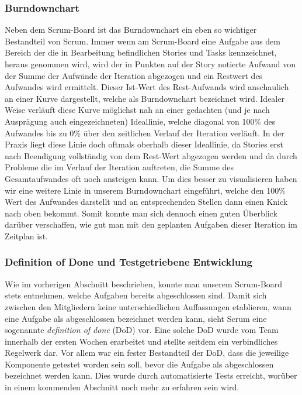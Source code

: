 \subsubsection{Burndownchart}
Neben dem Scrum-Board ist das Burndownchart ein eben so wichtiger Bestandteil von Scrum. Immer wenn am Scrum-Board eine Aufgabe aus dem Bereich der die in Bearbeitung befindlichen Stories und Tasks kennzeichnet, heraus genommen wird, wird der in Punkten auf der Story notierte Aufwand von der Summe der Aufwände der Iteration abgezogen und ein Restwert des Aufwandes wird ermittelt. Dieser Ist-Wert des Rest-Aufwands wird anschaulich an einer Kurve dargestellt, welche als Burndownchart bezeichnet wird.
Idealer Weise verläuft diese Kurve möglichst nah an einer gedachten (und je nach Ausprägung auch eingezeichneten) Ideallinie, welche diagonal von 100\% des Aufwandes bis zu 0\% über den zeitlichen Verlauf der Iteration verläuft. In der Praxis liegt diese Linie doch oftmals oberhalb dieser Ideallinie, da Stories erst nach Beendigung vollständig von dem Rest-Wert abgezogen werden und da durch Probleme die im Verlauf der Iteration auftreten, die Summe des Gesamtaufwandes oft noch ansteigen kann. Um dies besser zu visualisieren haben wir eine weitere Linie in unserem Burndownchart eingeführt, welche den 100\% Wert des Aufwandes darstellt und an entsprechenden Stellen dann einen Knick nach oben bekommt.
Somit konnte man sich dennoch einen guten Überblick darüber verschaffen, wie gut man mit den geplanten Aufgaben dieser Iteration im Zeitplan ist.


\subsubsection{Definition of Done und Testgetriebene Entwicklung}
Wie im vorherigen Abschnitt beschrieben, konnte man unserem Scrum-Board stets entnehmen, welche Aufgaben bereits abgeschlossen sind. Damit sich zwischen den Mitgliedern keine unterschiedlichen Auffassungen etablieren, wann eine Aufgabe als abgeschlossen bezeichnet werden kann, sieht Scrum eine sogenannte \textit{definition of done} (DoD) vor. Eine solche DoD wurde vom Team innerhalb der ersten Wochen erarbeitet und stellte seitdem ein verbindliches Regelwerk dar. Vor allem war ein fester Bestandteil der DoD, dass die jeweilige Komponente getestet worden sein soll, bevor die Aufgabe als abgeschlossen bezeichnet werden kann. Dies wurde durch automatisierte Tests erreicht, worüber in einem kommenden Abschnitt noch mehr zu erfahren sein wird.

